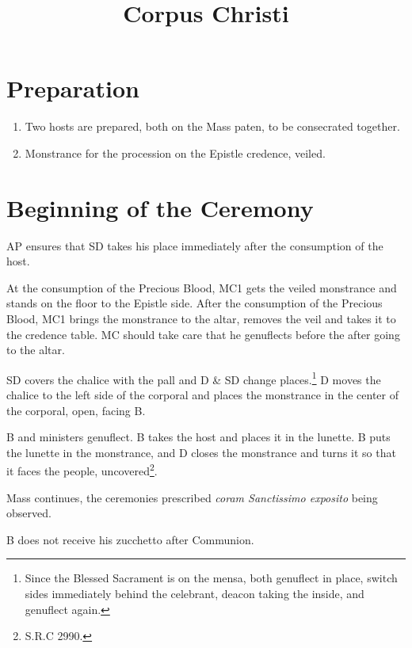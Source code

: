 \documentclass[letterpaper]{report}
\title{Corpus Christi}
\begin{document}
\maketitle

\section{Preparation}

\begin{enumerate}

    \item Two hosts are prepared, both on the Mass paten, to be consecrated together.

    \item Monstrance for the procession on the Epistle credence, veiled.

\end{enumerate}

\section{Beginning of the Ceremony}

\rubric AP ensures that SD takes his place immediately after the consumption of
the host. 

\rubric At the consumption of the Precious Blood, MC1 gets the veiled
monstrance and stands on the floor to the Epistle side. After the consumption
of the Precious Blood, MC1 brings the monstrance to the altar, removes the veil
and takes it to the credence table. MC should take care that he genuflects
before the after going to the altar. 


\rubric SD covers the chalice with the pall and D \& SD change
places.\footnote{Since the Blessed Sacrament is on the mensa, both genuflect in
place, switch sides immediately behind the celebrant, deacon taking the inside,
and genuflect again.} D moves the chalice to the left side of the corporal and
places the monstrance in the center of the corporal, open, facing B. 

\rubric B and ministers genuflect. B takes the host and places it in the
lunette. B puts the lunette in the monstrance, and D closes the monstrance and
turns it so that it faces the people, uncovered\footnote{S.R.C 2990.}.

\rubric Mass continues, the ceremonies prescribed \textit{coram Sanctissimo
exposito} being observed.

\rubric B does not receive his zucchetto after Communion.
\end{document}
